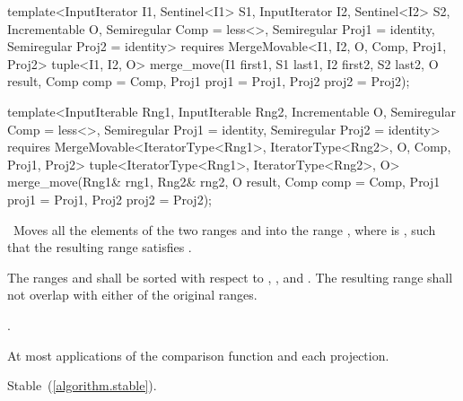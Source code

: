 \begin{addedblock}
%
\begin{itemdecl}
template<InputIterator I1, Sentinel<I1> S1, InputIterator I2, Sentinel<I2> S2,
    Incrementable O, Semiregular Comp = less<>, Semiregular Proj1 = identity,
    Semiregular Proj2 = identity>
  requires MergeMovable<I1, I2, O, Comp, Proj1, Proj2>
  tuple<I1, I2, O>
    merge_move(I1 first1, S1 last1, I2 first2, S2 last2, O result,
          Comp comp = Comp{}, Proj1 proj1 = Proj1{}, Proj2 proj2 = Proj2{});

template<InputIterable Rng1, InputIterable Rng2, Incrementable O, Semiregular Comp = less<>,
    Semiregular Proj1 = identity, Semiregular Proj2 = identity>
  requires MergeMovable<IteratorType<Rng1>, IteratorType<Rng2>, O, Comp, Proj1, Proj2>
  tuple<IteratorType<Rng1>, IteratorType<Rng2>, O>
    merge_move(Rng1& rng1, Rng2& rng2, O result,
          Comp comp = Comp{}, Proj1 proj1 = Proj1{}, Proj2 proj2 = Proj2{});
\end{itemdecl}

\begin{itemdescr}
\pnum
\effects\ Moves all the elements of the two ranges  and
 into the range , where 
is , such that the resulting range satisfies
.

\pnum
\requires The ranges  and  shall be
sorted with respect to , , and .
The resulting range shall not overlap with either of the original ranges.

\pnum
\returns
{}.

\pnum
\complexity
At most
applications of the comparison function and each projection.

\pnum
\remarks Stable~(\ref{algorithm.stable}).
\end{itemdescr}
\end{addedblock}

